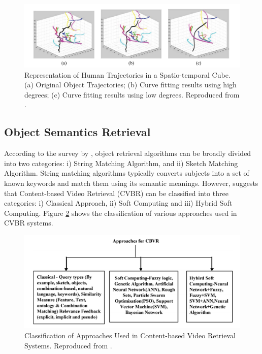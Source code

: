 \begin{figure}[hbt!]
  \centering
  \includegraphics[width=1\textwidth]{image/lit/spatiotemporal2.PNG}
  \caption[Representation of Human Trajectories in a Spatio-temporal Cube. (a)
  Original Object Trajectories; (b) Curve fitting results using high degrees;
  (c) Curve fitting results using low degrees] {Representation of Human
  Trajectories in a Spatio-temporal Cube. (a) Original Object Trajectories; (b)
  Curve fitting results using high degrees; (c) Curve fitting results using low
  degrees. Reproduced from .}
  \label{fig:spatiocube2}
\end{figure}



\vspace{1em}
\subsection{Object Semantics Retrieval}

According to the survey by \cite{chandran2017review}, object retrieval
algorithms can be broadly divided into two categories: i) String Matching
Algorithm, and ii) Sketch Matching Algorithm. String matching algorithms
typically converts subjects into a set of known keywords and match them using
its semantic meanings. However,  suggests that
Content-based Video Retrieval (CVBR) can be classified into three categories: i)
Classical Approach, ii) Soft Computing and iii) Hybrid Soft Computing. Figure
\ref{fig:cvbr} shows the classification of various approaches used in CVBR
systems.

\begin{figure}[hbt!]
  \centering
  \includegraphics[width=.9\textwidth]{image/lit/cvbr.PNG}
  \caption[Classification of Approaches Used in Content-based Video Retrieval
  Systems] {Classification of Approaches Used in Content-based Video Retrieval
  Systems. Reproduced from .}
  \label{fig:cvbr}
\end{figure}

